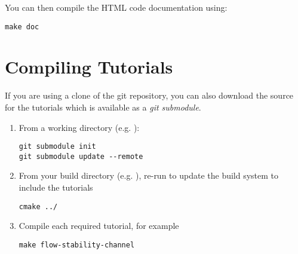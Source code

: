 You can then compile the HTML code documentation using:
\begin{lstlisting}[style=BashInputStyle]
make doc
\end{lstlisting}


\section{Compiling Tutorials}
If you are using a clone of the \nekpp git repository, you can also download
the source for the \nekpp tutorials which is available as a \emph{git submodule}.

\begin{enumerate}
\item From a \nekpp working directory (e.g. ):
\begin{lstlisting}[style=BashInputStyle]
git submodule init
git submodule update --remote
\end{lstlisting}
\item From your build directory (e.g. ), re-run  to update the build system to include the tutorials
\begin{lstlisting}[style=BashInputStyle]
cmake ../
\end{lstlisting}
\item Compile each required tutorial, for example
\begin{lstlisting}[style=BashInputStyle]
make flow-stability-channel
\end{lstlisting}
\end{enumerate}
